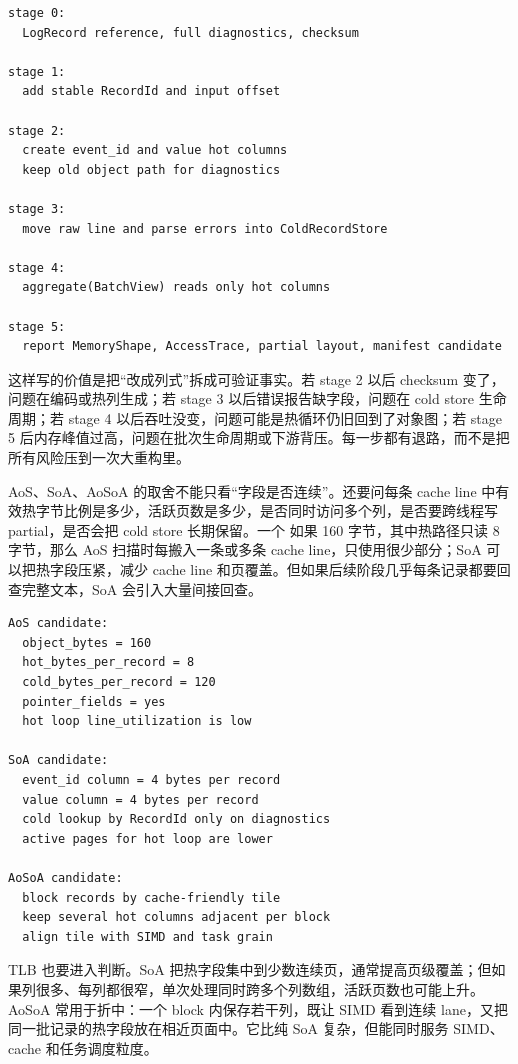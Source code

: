 \begin{lstlisting}[numbers=none,caption={布局迁移的可回滚阶段}]
stage 0:
  LogRecord reference, full diagnostics, checksum

stage 1:
  add stable RecordId and input offset

stage 2:
  create event_id and value hot columns
  keep old object path for diagnostics

stage 3:
  move raw line and parse errors into ColdRecordStore

stage 4:
  aggregate(BatchView) reads only hot columns

stage 5:
  report MemoryShape, AccessTrace, partial layout, manifest candidate
\end{lstlisting}

这样写的价值是把“改成列式”拆成可验证事实。若 stage 2 以后 checksum 变了，问题在编码或热列生成；若 stage 3 以后错误报告缺字段，问题在 cold store 生命周期；若 stage 4 以后吞吐没变，问题可能是热循环仍旧回到了对象图；若 stage 5 后内存峰值过高，问题在批次生命周期或下游背压。每一步都有退路，而不是把所有风险压到一次大重构里。

AoS、SoA、AoSoA 的取舍不能只看“字段是否连续”。还要问每条 cache line 中有效热字节比例是多少，活跃页数是多少，是否同时访问多个列，是否要跨线程写 partial，是否会把 cold store 长期保留。一个  如果 160 字节，其中热路径只读 8 字节，那么 AoS 扫描时每搬入一条或多条 cache line，只使用很少部分；SoA 可以把热字段压紧，减少 cache line 和页覆盖。但如果后续阶段几乎每条记录都要回查完整文本，SoA 会引入大量间接回查。

\begin{lstlisting}[numbers=none,caption={布局判断的硬件账本}]
AoS candidate:
  object_bytes = 160
  hot_bytes_per_record = 8
  cold_bytes_per_record = 120
  pointer_fields = yes
  hot loop line_utilization is low

SoA candidate:
  event_id column = 4 bytes per record
  value column = 4 bytes per record
  cold lookup by RecordId only on diagnostics
  active pages for hot loop are lower

AoSoA candidate:
  block records by cache-friendly tile
  keep several hot columns adjacent per block
  align tile with SIMD and task grain
\end{lstlisting}

TLB 也要进入判断。SoA 把热字段集中到少数连续页，通常提高页级覆盖；但如果列很多、每列都很窄，单次处理同时跨多个列数组，活跃页数也可能上升。AoSoA 常用于折中：一个 block 内保存若干列，既让 SIMD 看到连续 lane，又把同一批记录的热字段放在相近页面中。它比纯 SoA 复杂，但能同时服务 SIMD、cache 和任务调度粒度。

